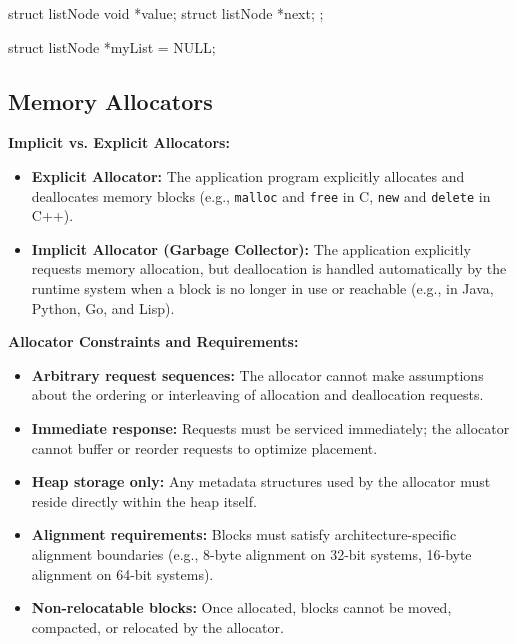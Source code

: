 \begin{codeexample}
struct listNode {
    void *value;
    struct listNode *next;
};

struct listNode *myList = NULL;
\end{codeexample}

\subsection{Memory Allocators}

\begin{definition}
    \textbf{Implicit vs. Explicit Allocators:}
    \begin{itemize}
        \item \textbf{Explicit Allocator:} The application program explicitly allocates and deallocates memory blocks (e.g., \texttt{malloc} and \texttt{free} in C, \texttt{new} and \texttt{delete} in C++).
        \item \textbf{Implicit Allocator (Garbage Collector):} The application explicitly requests memory allocation, but deallocation is handled automatically by the runtime system when a block is no longer in use or reachable (e.g., in Java, Python, Go, and Lisp).
    \end{itemize}
\end{definition}

\begin{remark}
    \textbf{Allocator Constraints and Requirements:}
    \begin{itemize}
        \item \textbf{Arbitrary request sequences:} The allocator cannot make assumptions about the ordering or interleaving of allocation and deallocation requests.
        \item \textbf{Immediate response:} Requests must be serviced immediately; the allocator cannot buffer or reorder requests to optimize placement.
        \item \textbf{Heap storage only:} Any metadata structures used by the allocator must reside directly within the heap itself.
        \item \textbf{Alignment requirements:} Blocks must satisfy architecture-specific alignment boundaries (e.g., 8-byte alignment on 32-bit systems, 16-byte alignment on 64-bit systems).
        \item \textbf{Non-relocatable blocks:} Once allocated, blocks cannot be moved, compacted, or relocated by the allocator.
    \end{itemize}
\end{remark}

